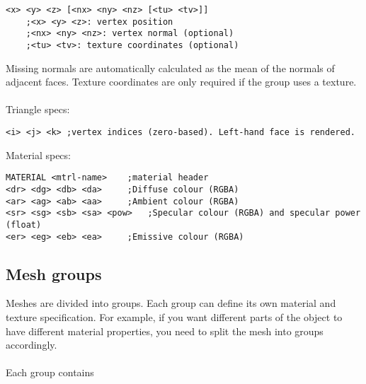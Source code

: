 \documentclass[Orbiter Developer Manual.tex]{subfiles}
\begin{document}
\begin{lstlisting}[language=MESH]
<x> <y> <z> [<nx> <ny> <nz> [<tu> <tv>]]
	;<x> <y> <z>: vertex position
	;<nx> <ny> <nz>: vertex normal (optional)
	;<tu> <tv>: texture coordinates (optional)
\end{lstlisting}

\noindent
Missing normals are automatically calculated as the mean of the normals of adjacent faces. Texture coordinates are only required if the group uses a texture.\\
\\
Triangle specs:

\begin{lstlisting}[language=MESH]
<i> <j> <k>	;vertex indices (zero-based). Left-hand face is rendered.
\end{lstlisting}

\noindent
Material specs:

\begin{lstlisting}[language=MESH]
MATERIAL <mtrl-name>	;material header
<dr> <dg> <db> <da>		;Diffuse colour (RGBA)
<ar> <ag> <ab> <aa>		;Ambient colour (RGBA)
<sr> <sg> <sb> <sa> <pow>	;Specular colour (RGBA) and specular power (float)
<er> <eg> <eb> <ea>		;Emissive colour (RGBA)
\end{lstlisting}


\subsection{Mesh groups}
Meshes are divided into groups. Each group can define its own material and texture specification. For example, if you want different parts of the object to have different material properties, you need to split the mesh into groups accordingly.\\
\\
Each group contains
\end{document}
